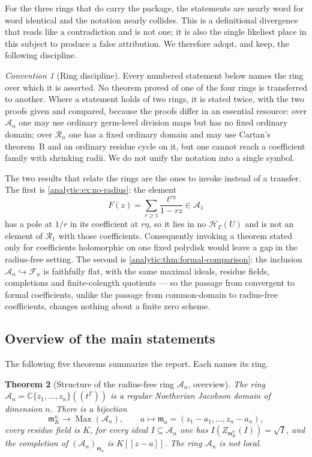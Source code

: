 \documentclass[11pt,letterpaper]{article}
\newtheorem{theorem}{Theorem}[section]
\theoremstyle{definition}
\theoremstyle{remark}
\newtheorem{convention}[theorem]{Convention}
\newcommand{\C}{\mathbb C}
\newcommand{\A}{\mathscr A}
\newcommand{\RR}{\mathscr R}
\newcommand{\FF}{\mathscr F}
\newcommand{\HH}{\mathcal H}
\newcommand{\m}{\mathfrak m}
\newcommand{\Max}{\operatorname{Max}}
\numberwithin{equation}{section}
\begin{document}
For the three rings that do carry the package, the statements are nearly word
for word identical and the notation nearly collides. This is a definitional divergence that reads
like a contradiction and is not one; it is also the single likeliest place
in this subject to produce a false attribution. We therefore adopt, and
keep, the following discipline.

\begin{convention}[Ring discipline]\label{analytic:conv:ring}
Every numbered statement below names the ring over which it is asserted. No
theorem proved of one of the four rings is transferred to another. Where a
statement holds of two rings, it is stated twice, with the two proofs given
and compared, because the proofs differ in an essential resource: over
$\A_n$ one may use ordinary germ-level division maps but has no fixed
ordinary domain; over $\RR_n$ one has a fixed ordinary domain and may use
Cartan's theorem~B and an ordinary residue cycle on it, but one cannot
reach a coefficient family with shrinking radii. We do not unify the
notation into a single symbol.
\end{convention}

The two results that relate the rings are the ones to invoke instead of a
transfer. The first is \cref{analytic:ex:no-radius}: the element
\[
 F(z)=\sum_{r\ge1}\frac{t^{r\eta}}{1-rz}\in\A_1
\]
has a pole at $1/r$ in its coefficient at $r\eta$, so it lies in no
$\HH_\Gamma(U)$ and is not an element of $\RR_1$ with those coefficients.
Consequently invoking a theorem stated only for coefficients holomorphic on
one fixed polydisk would leave a gap in the radius-free setting. The second
is \cref{analytic:thm:formal-comparison}: the inclusion $\A_n\hookrightarrow\FF_n$
is faithfully flat, with the same maximal ideals, residue fields,
completions and finite-colength quotients --- so the passage from
convergent to formal coefficients, unlike the passage from common-domain to
radius-free coefficients, changes nothing about a finite zero scheme.

\subsection{Overview of the main statements}\label{analytic:subsec:overview}
The following five theorems summarize the report. Each names its ring.

\begin{theorem}[Structure of the radius-free ring $\A_n$, overview]
\label{analytic:thm:overview-structure-A}
The ring $\A_n=\C\{z_1,\ldots,z_n\}((t^\Gamma))$ is a regular Noetherian
Jacobson domain of dimension $n$. There is a bijection
\[
 \m_K^n\longrightarrow\Max(\A_n),\qquad
 a\longmapsto\m_a=(z_1-a_1,\ldots,z_n-a_n),
\]
every residue field is $K$, for every ideal $I\subseteq\A_n$ one has
$I(Z_{\m_K^n}(I))=\sqrt I$, and the completion of $(\A_n)_{\m_a}$ is
$K[[z-a]]$. The ring $\A_n$ is not local.
\end{theorem}
\end{document}
